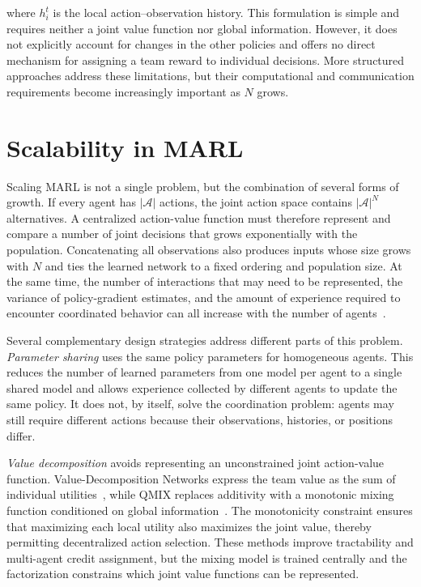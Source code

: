 where $h_i^t$ is the local action--observation history.
%
This formulation is simple and requires neither a joint value function nor global
information. However, it does not explicitly account for changes in the other
policies and offers no direct mechanism for assigning a team reward to individual
decisions.
%
More structured approaches address these limitations, but their computational
and communication requirements become increasingly important as $N$ grows.


\section{Scalability in MARL}
\label{sec:rl-scalability}

Scaling \gls{MARL} is not a single problem, 
 but the combination of several forms of growth.
%
If every agent has $|\mathcal{A}|$ actions, the joint action space contains
$|\mathcal{A}|^N$ alternatives. A centralized action-value function must therefore
represent and compare a number of joint decisions that grows exponentially with
the population.
%
Concatenating all observations also produces inputs whose size grows with $N$ and
ties the learned network to a fixed ordering and population size.
%
At the same time, the number of interactions that may need to be represented,
the variance of policy-gradient estimates, and the amount of experience required
to encounter coordinated behavior can all increase with the number of agents~\cite{DBLP:conf/nips/LoweWTHAM17}.

Several complementary design strategies address different parts of this problem.
%
\emph{Parameter sharing} uses the same policy parameters for homogeneous agents.
This reduces the number of learned parameters from one model per agent to a
single shared model and allows experience collected by different agents to update
the same policy.
%
It does not, by itself, solve the coordination problem: agents may still require
different actions because their observations, histories, or positions differ.

\emph{Value decomposition} avoids representing an unconstrained joint
action-value function.
%
Value-Decomposition Networks express the team value as the sum of individual
utilities~\cite{DBLP:conf/aaai/SunehagLGCZJLSL18}, while QMIX replaces additivity with a monotonic
mixing function conditioned on global information~\cite{DBLP:conf/icml/RashidSWFFW18}.
%
The monotonicity constraint ensures that maximizing each local utility also
maximizes the joint value, thereby permitting decentralized action selection.
%
These methods improve tractability and multi-agent credit assignment, but the
mixing model is trained centrally and the factorization constrains which joint
value functions can be represented.

